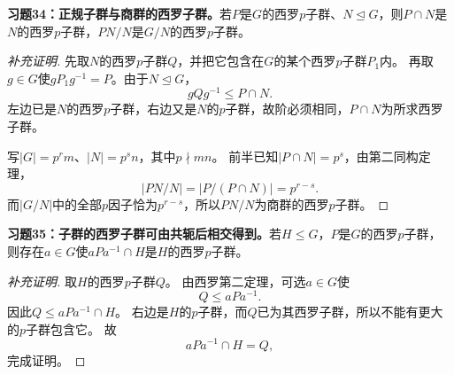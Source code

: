 \begin{problem}
\textbf{习题34：正规子群与商群的西罗子群。}若$P$是$G$的西罗$p$子群、$N\trianglelefteq G$，则$P\cap N$是$N$的西罗$p$子群，$PN/N$是$G/N$的西罗$p$子群。
\end{problem}
\begin{proof}[补充证明]
先取$N$的西罗$p$子群$Q$，并把它包含在$G$的某个西罗$p$子群$P_1$内。
再取$g\in G$使$gP_1g^{-1}=P$。由于$N\trianglelefteq G$，
\[
gQg^{-1}\leq P\cap N.
\]
左边已是$N$的西罗$p$子群，右边又是$N$的$p$子群，故阶必须相同，$P\cap N$为所求西罗子群。

写$|G|=p^rm$、$|N|=p^sn$，其中$p\nmid mn$。
前半已知$|P\cap N|=p^s$，由第二同构定理，
\[
|PN/N|=|P/(P\cap N)|=p^{r-s}.
\]
而$|G/N|$中的全部$p$因子恰为$p^{r-s}$，所以$PN/N$为商群的西罗$p$子群。
\end{proof}

\begin{problem}
\textbf{习题35：子群的西罗子群可由共轭后相交得到。}若$H\leq G$，$P$是$G$的西罗$p$子群，则存在$a\in G$使$aPa^{-1}\cap H$是$H$的西罗$p$子群。
\end{problem}
\begin{proof}[补充证明]
取$H$的西罗$p$子群$Q$。
由西罗第二定理，可选$a\in G$使
\[
Q\leq aPa^{-1}.
\]
因此$Q\leq aPa^{-1}\cap H$。
右边是$H$的$p$子群，而$Q$已为其西罗子群，所以不能有更大的$p$子群包含它。
故
\[
aPa^{-1}\cap H=Q,
\]
完成证明。
\end{proof}

